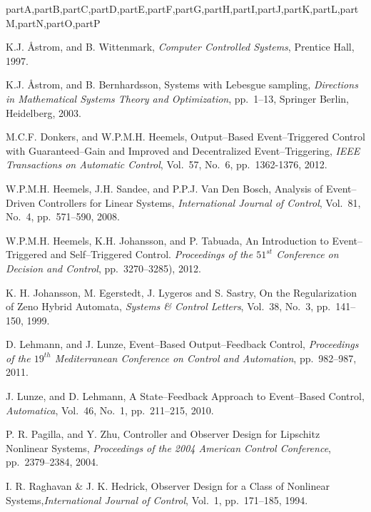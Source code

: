 \documentclass[letterpaper, 10 pt, conference]{ieeeconf}
\def\compile{partA,partB,partC,partD,partE,partF,partG,partH,partI,partJ,partK,partL,partM,partN,partO,partP}
\newenvironment{partP}[1][]{}{}
\begin{document}
\begin{xcomment}{\compile}
\begin{partP}
\begin{thebibliography}{99}
 K.J. \r{A}strom, and B. Wittenmark, {\sl Computer Controlled Systems}, Prentice Hall, 1997.

 K.J. \r{A}strom, and B. Bernhardsson, Systems with Lebesgue sampling, {\sl Directions in Mathematical Systems Theory and Optimization}, pp.~1--13, Springer Berlin, Heidelberg, 2003.





 M.C.F. Donkers, and W.P.M.H. Heemels, Output--Based Event--Triggered Control with Guaranteed--Gain and Improved and Decentralized Event--Triggering, {\sl IEEE Transactions on Automatic Control}, Vol.~57, No.~6, pp.~1362-1376, 2012.




 W.P.M.H. Heemels, J.H. Sandee, and P.P.J. Van Den Bosch, Analysis of Event--Driven Controllers for Linear Systems, {\sl International Journal of Control}, Vol.~81, No.~4, pp.~571--590, 2008.

 W.P.M.H. Heemels, K.H. Johansson, and P. Tabuada, An Introduction to Event--Triggered and Self--Triggered Control. {\sl Proceedings of the $51^{st}$ Conference on Decision and Control}, pp.~3270--3285), 2012.



  K. H. Johansson, M. Egerstedt, J. Lygeros and S. Sastry, On the Regularization of Zeno Hybrid Automata, {\sl Systems \& Control Letters}, Vol.~38, No.~3, pp.~141--150, 1999.







 D. Lehmann, and J. Lunze, Event--Based Output--Feedback Control, {\sl Proceedings of the $19^{th}$ Mediterranean Conference on Control and Automation}, pp.~982--987, 2011.

 J. Lunze, and D. Lehmann, A State--Feedback Approach to Event--Based Control, {\sl Automatica}, Vol.~46, No.~1, pp.~211--215, 2010.

 P. R. Pagilla, and Y. Zhu, Controller and Observer Design for Lipschitz Nonlinear Systems, {\sl Proceedings of the 2004 American Control Conference}, pp.~2379--2384, 2004.




 I. R. Raghavan \& J. K. Hedrick, Observer Design for a Class of Nonlinear Systems,{\sl International Journal of Control}, Vol.~1, pp.~171--185, 1994.



\end{thebibliography}
\end{partP}
\end{xcomment}
\end{document}

